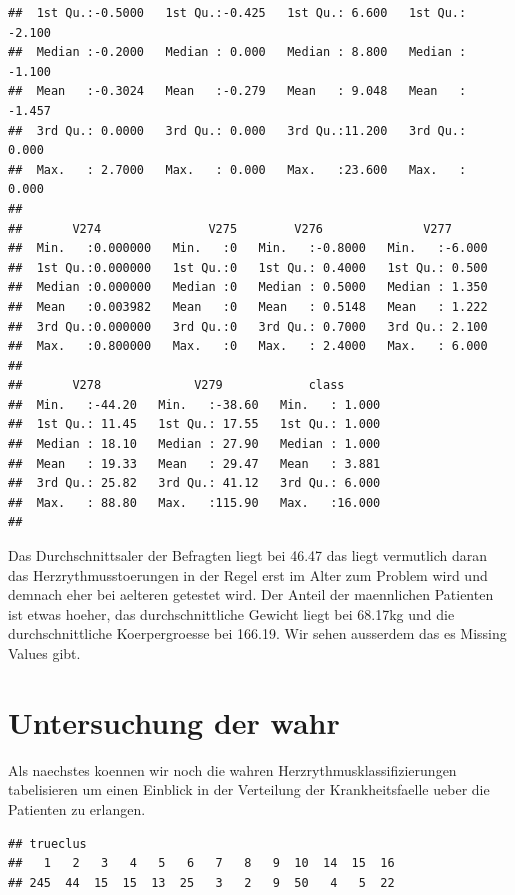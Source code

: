 \documentclass[
]{article}
\begin{document}
\begin{verbatim}
##  1st Qu.:-0.5000   1st Qu.:-0.425   1st Qu.: 6.600   1st Qu.: -2.100  
##  Median :-0.2000   Median : 0.000   Median : 8.800   Median : -1.100  
##  Mean   :-0.3024   Mean   :-0.279   Mean   : 9.048   Mean   : -1.457  
##  3rd Qu.: 0.0000   3rd Qu.: 0.000   3rd Qu.:11.200   3rd Qu.:  0.000  
##  Max.   : 2.7000   Max.   : 0.000   Max.   :23.600   Max.   :  0.000  
##                                                                       
##       V274               V275        V276              V277       
##  Min.   :0.000000   Min.   :0   Min.   :-0.8000   Min.   :-6.000  
##  1st Qu.:0.000000   1st Qu.:0   1st Qu.: 0.4000   1st Qu.: 0.500  
##  Median :0.000000   Median :0   Median : 0.5000   Median : 1.350  
##  Mean   :0.003982   Mean   :0   Mean   : 0.5148   Mean   : 1.222  
##  3rd Qu.:0.000000   3rd Qu.:0   3rd Qu.: 0.7000   3rd Qu.: 2.100  
##  Max.   :0.800000   Max.   :0   Max.   : 2.4000   Max.   : 6.000  
##                                                                   
##       V278             V279            class       
##  Min.   :-44.20   Min.   :-38.60   Min.   : 1.000  
##  1st Qu.: 11.45   1st Qu.: 17.55   1st Qu.: 1.000  
##  Median : 18.10   Median : 27.90   Median : 1.000  
##  Mean   : 19.33   Mean   : 29.47   Mean   : 3.881  
##  3rd Qu.: 25.82   3rd Qu.: 41.12   3rd Qu.: 6.000  
##  Max.   : 88.80   Max.   :115.90   Max.   :16.000  
## 
\end{verbatim}

Das Durchschnittsaler der Befragten liegt bei 46.47 das liegt vermutlich
daran das Herzrythmusstoerungen in der Regel erst im Alter zum Problem
wird und demnach eher bei aelteren getestet wird. Der Anteil der
maennlichen Patienten ist etwas hoeher, das durchschnittliche Gewicht
liegt bei 68.17kg und die durchschnittliche Koerpergroesse bei 166.19.
Wir sehen ausserdem das es Missing Values gibt.

\hypertarget{untersuchung-der-wahr}{%
\section{Untersuchung der wahr}\label{untersuchung-der-wahr}}

Als naechstes koennen wir noch die wahren Herzrythmusklassifizierungen
tabelisieren um einen Einblick in der Verteilung der Krankheitsfaelle
ueber die Patienten zu erlangen.

\begin{verbatim}
## trueclus
##   1   2   3   4   5   6   7   8   9  10  14  15  16 
## 245  44  15  15  13  25   3   2   9  50   4   5  22
\end{verbatim}
\end{document}
